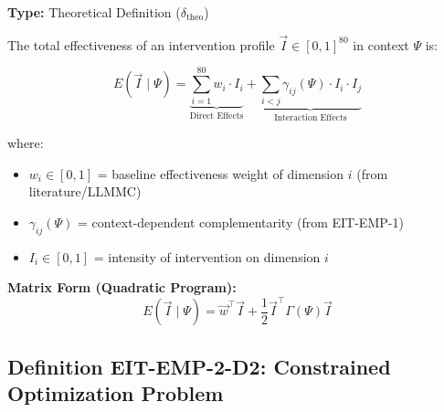 \begin{tcolorbox}[colback=blue!5!white, colframe=blue!75!black,
    title=\textbf{Definition EIT-EMP-2-D1: Intervention Effectiveness Function}]

\textbf{Type:} Theoretical Definition ($\delta_{\text{theo}}$)

The total effectiveness of an intervention profile $\vec{I} \in [0,1]^{80}$ in context $\Psi$ is:

\begin{equation}
\boxed{E(\vec{I} \;|\; \Psi) = \underbrace{\sum_{i=1}^{80} w_i \cdot I_i}_{\text{Direct Effects}} + \underbrace{\sum_{i<j} \gamma_{ij}(\Psi) \cdot I_i \cdot I_j}_{\text{Interaction Effects}}}
\label{eq:effectiveness-main}
\end{equation}

where:
\begin{itemize}[nosep]
    \item $w_i \in [0,1]$ = baseline effectiveness weight of dimension $i$ (from literature/LLMMC)
    \item $\gamma_{ij}(\Psi)$ = context-dependent complementarity (from EIT-EMP-1)
    \item $I_i \in [0,1]$ = intensity of intervention on dimension $i$
\end{itemize}

\textbf{Matrix Form (Quadratic Program):}
\begin{equation}
E(\vec{I} \;|\; \Psi) = \vec{w}^\top \vec{I} + \frac{1}{2} \vec{I}^\top \Gamma(\Psi) \vec{I}
\end{equation}

\end{tcolorbox}

\subsection{Definition EIT-EMP-2-D2: Constrained Optimization Problem}
\label{subsec:constrained-optimization}

